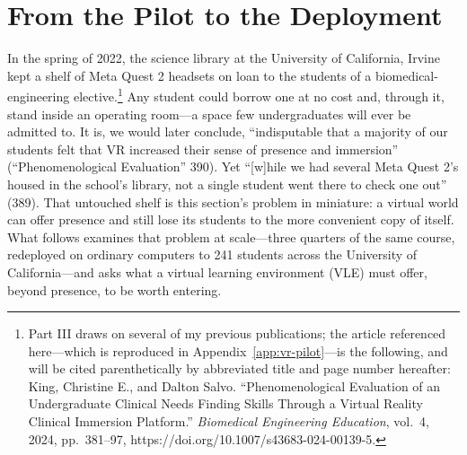 \section{From the Pilot to the Deployment}


In the spring of 2022, the science library at the University of California,
Irvine kept a shelf of Meta Quest 2 headsets on loan to the students of a
biomedical-engineering elective.\footnote{Part III draws on several of my
previous publications; the article referenced here---which is reproduced in
Appendix~\ref{app:vr-pilot}---is the following, and will be cited
parenthetically by abbreviated title and page number hereafter: King, Christine
E., and Dalton Salvo. ``Phenomenological Evaluation of an Undergraduate Clinical
Needs Finding Skills Through a Virtual Reality Clinical Immersion Platform.''
\textit{Biomedical Engineering Education}, vol.~4, 2024, pp.~381--97,
https://doi.org/10.1007/s43683-024-00139-5.} Any student could borrow one at no
cost and, through it, stand inside an operating room---a space few
undergraduates will ever be admitted to. It is, we would later conclude,
``indisputable that a majority of our students felt that VR increased their
sense of presence and immersion'' (``Phenomenological Evaluation'' 390). Yet
``[w]hile we had several Meta Quest 2's housed in the school's library, not a
single student went there to check one out'' (389). That untouched shelf is this
section's problem in miniature: a virtual world can offer presence and still
lose its students to the more convenient copy of itself. What follows examines
that problem at scale---three quarters of the same course, redeployed on
ordinary computers to 241 students across the University of California---and
asks what a virtual learning environment (VLE) must offer, beyond presence, to
be worth entering.


